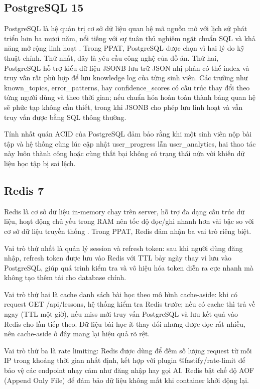 \documentclass[../main.tex]{subfiles}
\begin{document}
\subsection{PostgreSQL 15}

PostgreSQL là hệ quản trị cơ sở dữ liệu quan hệ mã nguồn mở với lịch sử phát triển hơn ba mươi năm, nổi tiếng với sự tuân thủ nghiêm ngặt chuẩn SQL và khả năng mở rộng linh hoạt \cite{postgres2024docs}. Trong PPAT, PostgreSQL được chọn vì hai lý do kỹ thuật chính. Thứ nhất, đây là yêu cầu công nghệ của đồ án. Thứ hai, PostgreSQL hỗ trợ kiểu dữ liệu JSONB lưu trữ JSON nhị phân có thể index và truy vấn rất phù hợp để lưu knowledge log của từng sinh viên. Các trường như known\_topics, error\_patterns, hay confidence\_scores có cấu trúc thay đổi theo từng người dùng và theo thời gian; nếu chuẩn hóa hoàn toàn thành bảng quan hệ sẽ phức tạp không cần thiết, trong khi JSONB cho phép lưu linh hoạt và vẫn truy vấn được bằng SQL thông thường.

Tính nhất quán ACID của PostgreSQL đảm bảo rằng khi một sinh viên nộp bài tập và hệ thống cùng lúc cập nhật user\_progress lẫn user\_analytics, hai thao tác này luôn thành công hoặc cùng thất bại không có trạng thái nửa vời khiến dữ liệu học tập bị sai lệch.

\subsection{Redis 7}

Redis là cơ sở dữ liệu in-memory chạy trên server, hỗ trợ đa dạng cấu trúc dữ liệu, hoạt động chủ yếu trong RAM nên tốc độ đọc/ghi nhanh hơn vài bậc so với cơ sở dữ liệu truyền thống \cite{redis2024docs}. Trong PPAT, Redis đảm nhận ba vai trò riêng biệt.

Vai trò thứ nhất là quản lý session và refresh token: sau khi người dùng đăng nhập, refresh token được lưu vào Redis với TTL bảy ngày thay vì lưu vào PostgreSQL, giúp quá trình kiểm tra và vô hiệu hóa token diễn ra cực nhanh mà không tạo thêm tải cho database chính.

Vai trò thứ hai là cache danh sách bài học theo mô hình cache-aside: khi có request GET /\allowbreak api/\allowbreak lessons, hệ thống kiểm tra Redis trước; nếu có cache thì trả về ngay (TTL một giờ), nếu miss mới truy vấn PostgreSQL và lưu kết quả vào Redis cho lần tiếp theo. Dữ liệu bài học ít thay đổi nhưng được đọc rất nhiều, nên cache-aside ở đây mang lại hiệu quả rõ rệt.

Vai trò thứ ba là rate limiting: Redis được dùng để đếm số lượng request từ mỗi IP trong khoảng thời gian nhất định, kết hợp với plugin @fastify/rate-limit để bảo vệ các endpoint nhạy cảm như đăng nhập hay gọi AI. Redis bật chế độ AOF (Append Only File) để đảm bảo dữ liệu không mất khi container khởi động lại.
\end{document}
